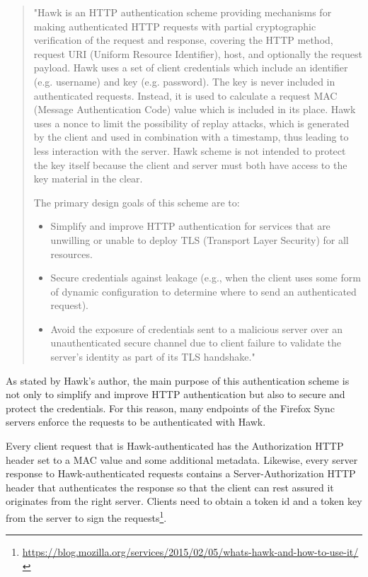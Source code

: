 \begin{quote}
"Hawk is an HTTP authentication scheme providing mechanisms for making authenticated HTTP requests with partial cryptographic verification of the request and response, covering the HTTP method, request URI (Uniform Resource Identifier), host, and optionally the request payload. Hawk uses a set of client credentials which include an identifier (e.g. username) and key (e.g. password). The key is never included in authenticated requests. Instead, it is used to calculate a request MAC (Message Authentication Code) value which is included in its place. Hawk uses a nonce to limit the possibility of replay attacks, which is generated by the client and used in combination with a timestamp, thus leading to less interaction with the server. Hawk scheme is not intended to protect the key itself because the client and server must both have access to the key material in the clear.

The primary design goals of this scheme are to:
\begin{itemize}
  \item Simplify and improve HTTP authentication for services that are unwilling or unable to deploy TLS (Transport Layer Security) for all resources.

  \item Secure credentials against leakage (e.g., when the client uses some form of dynamic configuration to determine where to send an authenticated request).

  \item Avoid the exposure of credentials sent to a malicious server over an unauthenticated secure channel due to client failure to validate the server's identity as part of its TLS handshake." \cite{hawk-scheme}
\end{itemize}
\end{quote}

As stated by Hawk's author, the main purpose of this authentication scheme is not only to simplify and improve HTTP authentication but also to secure and protect the credentials. For this reason, many endpoints of the Firefox Sync servers enforce the requests to be authenticated with Hawk.

Every client request that is Hawk-authenticated has the Authorization HTTP header set to a MAC value and some additional metadata. Likewise, every server response to Hawk-authenticated requests contains a Server-Authorization HTTP header that authenticates the response so that the client can rest assured it originates from the right server. Clients need to obtain a token id and a token key from the server to sign the requests\footnote{\url{https://blog.mozilla.org/services/2015/02/05/whats-hawk-and-how-to-use-it/}}.

